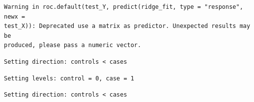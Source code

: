 \documentclass[
  letterpaper,
  DIV=11,
  numbers=noendperiod]{scrartcl}
\newenvironment{Shaded}{\begin{snugshade}}{\end{snugshade}}
\newcommand{\AttributeTok}[1]{\textcolor[rgb]{0.40,0.45,0.13}{#1}}
\newcommand{\DecValTok}[1]{\textcolor[rgb]{0.68,0.00,0.00}{#1}}
\newcommand{\FunctionTok}[1]{\textcolor[rgb]{0.28,0.35,0.67}{#1}}
\newcommand{\NormalTok}[1]{\textcolor[rgb]{0.00,0.23,0.31}{#1}}
\newcommand{\OtherTok}[1]{\textcolor[rgb]{0.00,0.23,0.31}{#1}}
\newcommand{\SpecialCharTok}[1]{\textcolor[rgb]{0.37,0.37,0.37}{#1}}
\newcommand{\StringTok}[1]{\textcolor[rgb]{0.13,0.47,0.30}{#1}}
\begin{document}
\begin{verbatim}
Warning in roc.default(test_Y, predict(ridge_fit, type = "response", newx =
test_X)): Deprecated use a matrix as predictor. Unexpected results may be
produced, please pass a numeric vector.
\end{verbatim}

\begin{verbatim}
Setting direction: controls < cases
\end{verbatim}

\begin{Shaded}
\end{Shaded}

\begin{verbatim}
Setting levels: control = 0, case = 1
\end{verbatim}

\begin{verbatim}
Setting direction: controls < cases
\end{verbatim}

\begin{Shaded}
\end{Shaded}
\end{document}
